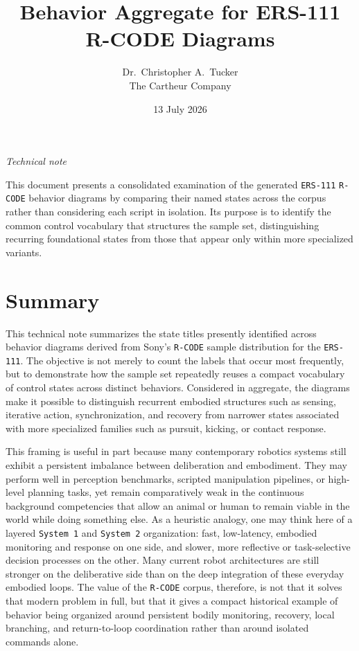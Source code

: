 \documentclass[11pt]{article}
\title{Behavior Aggregate for ERS-111 R-CODE Diagrams}
\author{Dr.\ Christopher A.\ Tucker \\ The Cartheur Company}
\date{13 July 2026}
\begin{document}
\maketitle

\begin{center}
\textit{Technical note}
\end{center}

\noindent
This document presents a consolidated examination of the generated
\texttt{ERS-111} \texttt{R-CODE} behavior diagrams by comparing their named
states across the corpus rather than considering each script in
isolation. Its purpose is to identify the common control vocabulary
that structures the sample set, distinguishing recurring foundational
states from those that appear only within more specialized variants.

\section*{Summary}

This technical note summarizes the state titles presently identified
across behavior diagrams derived from Sony's \texttt{R-CODE} sample
distribution for the \texttt{ERS-111}. The objective is not merely to
count the labels that occur most frequently, but to demonstrate how the
sample set repeatedly reuses a compact vocabulary of control states
across distinct behaviors. Considered in aggregate, the diagrams make
it possible to distinguish recurrent embodied structures such as
sensing, iterative action, synchronization, and recovery from narrower
states associated with more specialized families such as pursuit,
kicking, or contact response.

This framing is useful in part because many contemporary robotics
systems still exhibit a persistent imbalance between deliberation and
embodiment. They may perform well in perception benchmarks, scripted
manipulation pipelines, or high-level planning tasks, yet remain
comparatively weak in the continuous background competencies that allow
an animal or human to remain viable in the world while doing something
else. As a heuristic analogy, one may think here of a layered
\texttt{System 1} and \texttt{System 2} organization: fast,
low-latency, embodied monitoring and response on one side, and slower,
more reflective or task-selective decision processes on the other.
Many current robot architectures are still stronger on the deliberative
side than on the deep integration of these everyday embodied loops.
The value of the \texttt{R-CODE} corpus, therefore, is not that it
solves that modern problem in full, but that it gives a compact
historical example of behavior being organized around persistent bodily
monitoring, recovery, local branching, and return-to-loop coordination
rather than around isolated commands alone.
\end{document}
